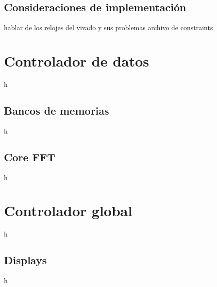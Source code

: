 \subsection{Consideraciones de implementación}
hablar de los relojes del vivado y sus problemas
archivo de constraints
\section{Controlador de datos}
h
\subsection{Bancos de memorias}
h
\subsection{Core FFT}
h
\section{Controlador global}
h
\subsection{Displays}
h 